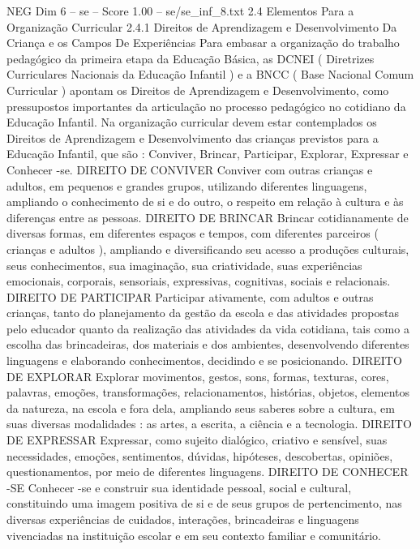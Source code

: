 \begin{textsample}{NEG Dim 6 – se – Score 1.00 – se/se\_inf\_8.txt}  \label{ex:f6_neg_248}
2.4 Elementos Para a Organização Curricular 2.4.1 Direitos de Aprendizagem e Desenvolvimento Da Criança e os Campos De Experiências Para embasar a organização do trabalho pedagógico da primeira etapa da Educação Básica, as DCNEI ( Diretrizes Curriculares Nacionais da Educação Infantil ) e a BNCC ( Base Nacional Comum Curricular ) apontam os Direitos de Aprendizagem e Desenvolvimento, como pressupostos importantes da articulação no processo pedagógico no cotidiano da Educação Infantil.
Na organização curricular devem estar contemplados os Direitos de Aprendizagem e Desenvolvimento das crianças previstos para a Educação Infantil, que são : Conviver, Brincar, Participar, Explorar, Expressar e Conhecer -se.
DIREITO DE CONVIVER Conviver com outras crianças e adultos, em pequenos e grandes grupos, utilizando diferentes linguagens, ampliando o conhecimento de si e do outro, o respeito em relação à cultura e às diferenças entre as pessoas.
DIREITO DE BRINCAR Brincar cotidianamente de diversas formas, em diferentes espaços e tempos, com diferentes parceiros ( crianças e adultos ), ampliando e diversificando seu acesso a produções culturais, seus conhecimentos, sua imaginação, sua criatividade, suas experiências emocionais, corporais, sensoriais, expressivas, cognitivas, sociais e relacionais.
DIREITO DE PARTICIPAR Participar ativamente, com adultos e outras crianças, tanto do planejamento da gestão da escola e das atividades propostas pelo educador quanto da realização das atividades da vida cotidiana, tais como a escolha das brincadeiras, dos materiais e dos ambientes, desenvolvendo diferentes linguagens e elaborando conhecimentos, decidindo e se posicionando.
DIREITO DE EXPLORAR Explorar movimentos, gestos, sons, formas, texturas, cores, palavras, emoções, transformações, relacionamentos, histórias, objetos, elementos da natureza, na escola e fora dela, ampliando seus saberes sobre a cultura, em suas diversas modalidades : as artes, a escrita, a ciência e a tecnologia.
DIREITO DE EXPRESSAR Expressar, como sujeito dialógico, criativo e sensível, suas necessidades, emoções, sentimentos, dúvidas, hipóteses, descobertas, opiniões, questionamentos, por meio de diferentes linguagens.
DIREITO DE CONHECER -SE Conhecer -se e construir sua identidade pessoal, social e cultural, constituindo uma imagem positiva de si e de seus grupos de pertencimento, nas diversas experiências de cuidados, interações, brincadeiras e linguagens vivenciadas na instituição escolar e em seu contexto familiar e comunitário.

\end{textsample}
